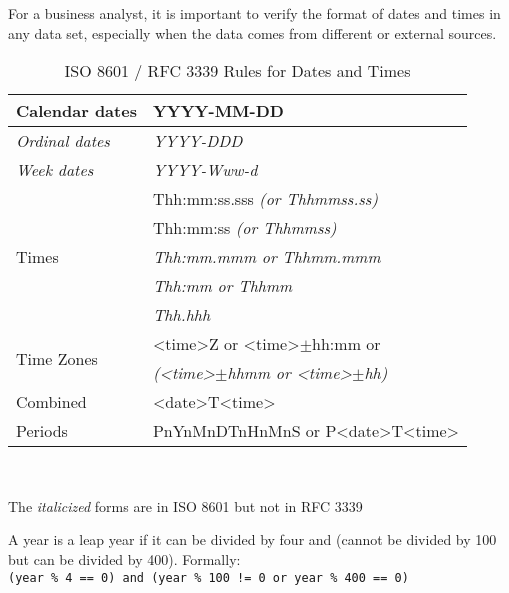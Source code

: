 \begin{tcolorbox}[colback=alert]
For a business analyst, it is important to verify the format of dates and times in any data set, especially when the data comes from different or external sources.
\end{tcolorbox}

\begin{table}
\centering
\renewcommand{\arraystretch}{1.25}

\begin{tabular}{l|l} \hline
	Calendar dates & YYYY-MM-DD  \\ \hline
	\textit{Ordinal dates} & \textit{YYYY-DDD} \\ \hline
	\textit{Week dates} & \textit{YYYY-Www-d} \\ \hline
	\multirow{5}{*}{Times} & Thh:mm:ss.sss \textit{(or Thhmmss.ss)} \\
	& Thh:mm:ss \textit{(or Thhmmss)} \\
	& \textit{Thh:mm.mmm or Thhmm.mmm} \\
	& \textit{Thh:mm or Thhmm} \\
	& \textit{Thh.hhh} \\ \hline
	\multirow{2}{*}{Time Zones} & <time>Z or <time>$\pm$hh:mm or \\
	& \textit{(<time>$\pm$hhmm or <time>$\pm$hh)} \\ \hline
	Combined & <date>T<time> \\
	Periods & PnYnMnDTnHnMnS or P<date>T<time> \\ \hline
\end{tabular} \\ \vspace{.5\baselineskip}

\small The \textit{italicized} forms are in ISO 8601 but not in RFC 3339
\caption{ISO 8601 / RFC 3339 Rules for Dates and Times}
\label{tab:iso8601}
\end{table}

\begin{tcolorbox}[colback=alert]
A year is a leap year if it can be divided by four and (cannot be divided by 100 but can be divided by 400). Formally: \\
\small
\texttt{(year \% 4 == 0) and (year \% 100 != 0 or year \% 400 == 0)}
\normalsize
\end{tcolorbox}
 
